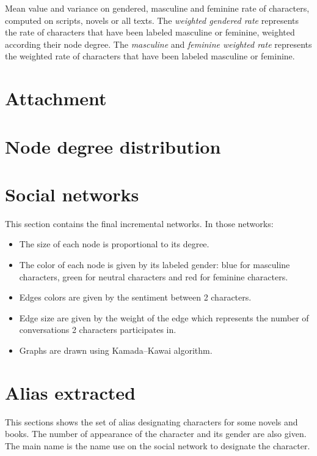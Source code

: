 \documentclass[a4paper, 12pt]{report}
\begin{document}
\begin{appendices}
\begin{table}[]
\caption{Mean value and variance on gendered, masculine and feminine rate of characters, computed on scripts, novels or all texts. The \textit{weighted gendered rate} represents the rate of characters that have been labeled masculine or feminine, weighted according their node degree. The \textit{masculine} and \textit{feminine weighted rate} represents the weighted rate of characters that have been labeled masculine or feminine. }
 \label{gender_all_weighted}
\end{table}












\chapter{Attachment}
\label{ref_attachement}





\chapter{Node degree distribution}
\label{a_degree}







\chapter{Social networks}
This section contains the final incremental networks. In those networks:
\begin{itemize}
\item The size of each node is proportional to its degree.
\item The color of each node is given by its labeled gender: blue for masculine characters, green for neutral characters and red for feminine characters.
\item Edges colors are given by the sentiment between 2 characters.
\item Edge size are given by the weight of the edge which represents the number of conversations 2 characters participates in.
\item Graphs are drawn using Kamada–Kawai algorithm. 
\end{itemize}
\label{final_sn}


\chapter{Alias extracted}
This sections shows the set of alias designating characters for some novels and books.
The number of appearance of the character and its gender are also given. 
The main name is the name use on the social network to designate the character.
\label{alias_extracted}



\end{appendices} 
\end{document}
